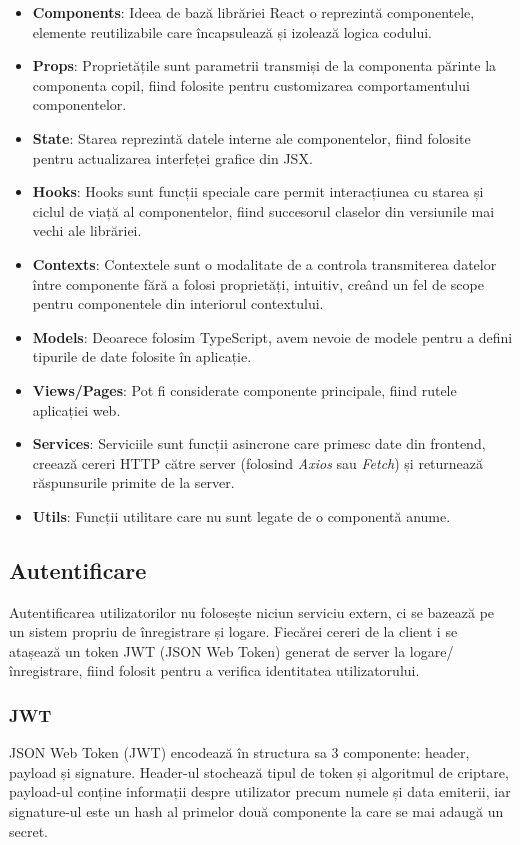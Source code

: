 \begin{itemize}
    \item \textbf{Components}: Ideea de bază librăriei React o reprezintă componentele, elemente
    reutilizabile care încapsulează și izolează logica codului.
    \item \textbf{Props}: Proprietățile sunt parametrii transmiși de la componenta părinte
    la componenta copil, fiind folosite pentru customizarea comportamentului componentelor.
    \item \textbf{State}: Starea reprezintă datele interne ale componentelor, fiind folosite pentru
    actualizarea interfeței grafice din JSX.
    \item \textbf{Hooks}: Hooks sunt funcții speciale care permit interacțiunea cu starea și ciclul
    de viață al componentelor, fiind succesorul claselor din versiunile mai vechi ale librăriei.
    \item \textbf{Contexts}: Contextele sunt o modalitate de a controla transmiterea datelor între
    componente fără a folosi proprietăți, intuitiv, creând un fel de scope pentru componentele din
    interiorul contextului.
    \item \textbf{Models}: Deoarece folosim TypeScript, avem nevoie de modele pentru a defini tipurile
    de date folosite în aplicație.
    \item \textbf{Views/Pages}: Pot fi considerate componente principale, fiind rutele aplicației web.
    \item \textbf{Services}: Serviciile sunt funcții asincrone care primesc date din frontend,
    creează cereri HTTP către server (folosind \textit{Axios} sau \textit{Fetch}) și returnează
    răspunsurile primite de la server.
    \item \textbf{Utils}: Funcții utilitare care nu sunt legate de o componentă anume.
\end{itemize}

\subsection{Autentificare}
Autentificarea utilizatorilor nu folosește niciun serviciu extern, ci se bazează pe un sistem
propriu de înregistrare și logare. Fiecărei cereri de la client i se atașează un token JWT
(JSON Web Token) generat de server la logare/înregistrare, fiind folosit pentru a verifica
identitatea utilizatorului. 

\subsubsection{JWT}
JSON Web Token (JWT) encodează în structura sa 3 componente: header, payload și signature.
Header-ul stochează tipul de token și algoritmul de criptare, payload-ul conține informații
despre utilizator precum numele și data emiterii, iar signature-ul este un hash al primelor
două componente la care se mai adaugă un secret.

